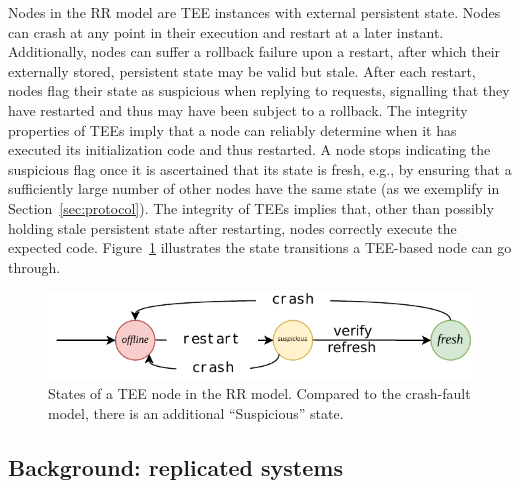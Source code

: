 Nodes in the \ac{RR} model are \ac{TEE} instances with external
persistent state. Nodes can crash at any point in their execution
and restart at a later instant.  Additionally, nodes can suffer a
rollback failure upon a restart, after which their externally
stored, persistent state may be valid but stale.  After each
restart, nodes flag their state as suspicious when replying to
requests, signalling that they have restarted and thus may have
been subject to a rollback. The integrity properties of \acp{TEE}
imply that a node can reliably determine when it has executed its
initialization code and thus restarted. A node stops indicating
the suspicious flag once it is ascertained that its state is
fresh, e.g., by ensuring that a sufficiently large number of
other nodes have the same state (as we exemplify in
Section~\ref{sec:protocol}).
The integrity of \acp{TEE} implies that, other than possibly holding stale
persistent state after restarting, nodes correctly execute the
expected code.  Figure~\ref{fig:states} illustrates the state
transitions a \ac{TEE}-based node can go through.

\begin{figure}[t]
    \centering
    \includegraphics[width=\linewidth]{img/TEE_states}
    \caption{States of a \ac{TEE} node in the \ac{RR} model. Compared
      to the crash-fault model, there is an additional ``Suspicious''
      state.}\label{fig:states}
\end{figure}

\subsection{Background: replicated systems}\label{ssec:sys_model}

